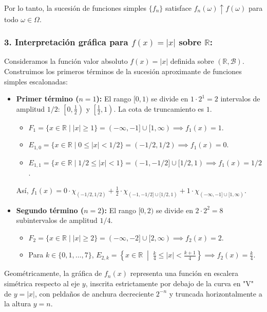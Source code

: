 \begin{problema}
Por lo tanto, la sucesión de funciones simples $\{f_n\}$ satisface $f_n(\omega) \uparrow f(\omega)$ para todo $\omega \in \Omega$.

\subsubsection*{3. Interpretación gráfica para $f(x) = |x|$ sobre $\mathbb{R}$:}
Consideramos la función valor absoluto $f(x) = |x|$ definida sobre $(\mathbb{R}, \mathcal{B})$. Construimos los primeros términos de la sucesión aproximante de funciones simples escalonadas:

\begin{itemize}
    \item \textbf{Primer término ($n = 1$):}
    El rango $[0, 1)$ se divide en $1 \cdot 2^1 = 2$ intervalos de amplitud $1/2$: $\left[0, \frac{1}{2}\right)$ y $\left[\frac{1}{2}, 1\right)$. La cota de truncamiento es $1$.
    \begin{itemize}
        \item $F_1 = \{x \in \mathbb{R} \mid |x| \ge 1\} = (-\infty, -1] \cup [1, \infty) \implies f_1(x) = 1$.
        \item $E_{1,0} = \{x \in \mathbb{R} \mid 0 \le |x| < 1/2\} = (-1/2, 1/2) \implies f_1(x) = 0$.
        \item $E_{1,1} = \{x \in \mathbb{R} \mid 1/2 \le |x| < 1\} = (-1, -1/2] \cup [1/2, 1) \implies f_1(x) = 1/2$.
    \end{itemize}
    Así, $f_1(x) = 0 \cdot \chi_{(-1/2, 1/2)} + \frac{1}{2} \cdot \chi_{(-1, -1/2] \cup [1/2, 1)} + 1 \cdot \chi_{(-\infty, -1] \cup [1, \infty)}$.

    \item \textbf{Segundo término ($n = 2$):}
    El rango $[0, 2)$ se divide en $2 \cdot 2^2 = 8$ subintervalos de amplitud $1/4$.
    \begin{itemize}
        \item $F_2 = \{x \in \mathbb{R} \mid |x| \ge 2\} = (-\infty, -2] \cup [2, \infty) \implies f_2(x) = 2$.
        \item Para $k \in \{0, 1, \dots, 7\}$, $E_{2,k} = \left\{x \in \mathbb{R} \;\middle|\; \frac{k}{4} \le |x| < \frac{k+1}{4}\right\} \implies f_2(x) = \frac{k}{4}$.
    \end{itemize}
\end{itemize}

Geométricamente, la gráfica de $f_n(x)$ representa una función en escalera simétrica respecto al eje $y$, inscrita estrictamente por debajo de la curva en "V" de $y = |x|$, con peldaños de anchura decreciente $2^{-n}$ y truncada horizontalmente a la altura $y = n$.


\end{problema}
